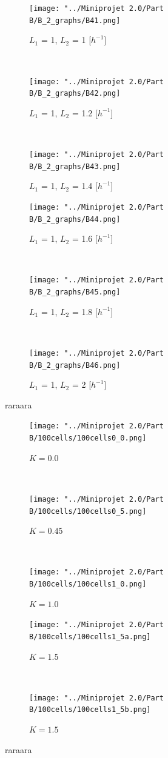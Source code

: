 \documentclass[10pt,a4paper,oneside,twocolumn]{article}
\numberwithin{equation}{section} %
\begin{document}
    \begin{figure}
    \centering
	\begin{subfigure}[b]{0.32\textwidth}
	    \texttt{[image: "../Miniprojet 2.0/Part B/B\_2\_graphs/B41.png]}
	    \caption{$L_1$ = 1, $L_2$ = 1 [$h^{-1}$]}
	\end{subfigure}
	~ 
	\begin{subfigure}[b]{0.32\textwidth}
	    \texttt{[image: "../Miniprojet 2.0/Part B/B\_2\_graphs/B42.png]}
	    \caption{$L_1$ = 1, $L_2$ = 1.2 [$h^{-1}$]}
	\end{subfigure}
	~ 
	\begin{subfigure}[b]{0.32\textwidth}
	    \texttt{[image: "../Miniprojet 2.0/Part B/B\_2\_graphs/B43.png]}
	    \caption{$L_1$ = 1, $L_2$ = 1.4 [$h^{-1}$]}
	\end{subfigure}
	 
	\begin{subfigure}[b]{0.32\textwidth}
	    \texttt{[image: "../Miniprojet 2.0/Part B/B\_2\_graphs/B44.png]}
	    \caption{$L_1$ = 1, $L_2$ = 1.6 [$h^{-1}$]}
	\end{subfigure}
	~ 
	\begin{subfigure}[b]{0.32\textwidth}
	    \texttt{[image: "../Miniprojet 2.0/Part B/B\_2\_graphs/B45.png]}
	    \caption{$L_1$ = 1, $L_2$ = 1.8 [$h^{-1}$]}
	\end{subfigure}
	~ 
	\begin{subfigure}[b]{0.32\textwidth}
	    \texttt{[image: "../Miniprojet 2.0/Part B/B\_2\_graphs/B46.png]}
	    \caption{$L_1$ = 1, $L_2$ = 2 [$h^{-1}$]}
	\end{subfigure}

	\caption{raraara}
    \end{figure}

    \begin{figure}
    \centering
	\begin{subfigure}[b]{0.45\textwidth}
	    \texttt{[image: "../Miniprojet 2.0/Part B/100cells/100cells0\_0.png]}
	    \caption{$K=0.0$}
	\end{subfigure}
	~ 
	\begin{subfigure}[b]{0.45\textwidth}
	    \texttt{[image: "../Miniprojet 2.0/Part B/100cells/100cells0\_5.png]}
	    \caption{$K=0.45$}
	\end{subfigure}
	~ 
	\begin{subfigure}[b]{0.45\textwidth}
	    \texttt{[image: "../Miniprojet 2.0/Part B/100cells/100cells1\_0.png]}
	    \caption{$K=1.0$}
	\end{subfigure}
	 
	\begin{subfigure}[b]{0.45\textwidth}
	    \texttt{[image: "../Miniprojet 2.0/Part B/100cells/100cells1\_5a.png]}
	    \caption{$K=1.5$}
	\end{subfigure}
	~ 
	\begin{subfigure}[b]{0.45\textwidth}
	    \texttt{[image: "../Miniprojet 2.0/Part B/100cells/100cells1\_5b.png]}
	    \caption{$K=1.5$}
	\end{subfigure}

	\caption{raraara}
    \end{figure}
\end{document}
